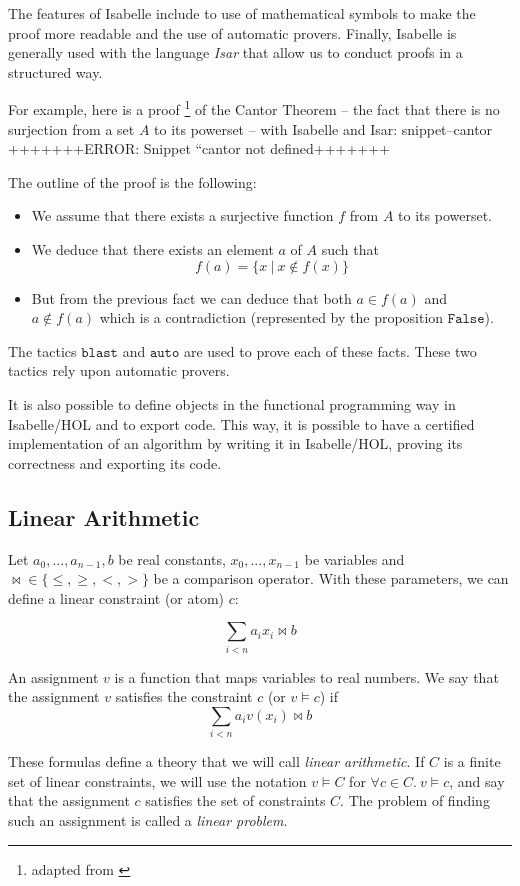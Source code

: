 \documentclass{article}
\newcommand{\Snippet}[1]{%
  \ifcsname snippet--#1\endcsname{\csname snippet--#1\endcsname}%
  \else+++++++ERROR: Snippet ``#1 not defined+++++++ \fi}
\begin{document}
The features of Isabelle include to use of mathematical symbols to make the
proof more readable and the use of automatic provers.
Finally, Isabelle is generally used with the language \textit{Isar} that allow
us to conduct proofs in a structured way.

For example, here is a proof
\footnote{adapted from \cite[Section 5.1]{ConcreteSemantics}}
of the Cantor Theorem -- the fact that there is no surjection from a set $A$ to
its powerset -- with Isabelle and Isar:
\Snippet{cantor}

The outline of the proof is the following:
\begin{itemize}
  \item We assume that there exists a surjective function $f$ from $A$ to
    its powerset.
  \item We deduce that there exists an element $a$ of $A$ such that
    $$f(a) = \{x~|~x \notin f(x)\}$$
  \item But from the previous fact we can deduce that both $a \in f(a)$ and $a
    \notin f(a)$ which is a contradiction (represented by the proposition
    $\mathtt{False}$).
\end{itemize}
The tactics $\mathtt{blast}$ and $\mathtt{auto}$
are used to prove each of these facts. These two tactics rely upon automatic
provers.

It is also possible to define objects in the functional programming way in
Isabelle/HOL and to export code. This way, it is possible to have a certified
implementation of an algorithm by writing it in Isabelle/HOL, proving its
correctness and exporting its code.

\subsection{Linear Arithmetic}

Let $a_0, ..., a_{n-1}, b$ be real constants, $x_0, ..., x_{n-1}$ be
variables and ${\bowtie} \in \{\leqslant,\geqslant,<,>\}$ be a comparison
operator. With these parameters, we can define a linear constraint (or atom)
$c$:

$$\sum_{i < n} a_i x_i \bowtie b$$

An assignment $v$ is a function that maps variables to real numbers.
We say that the assignment $v$ satisfies the constraint $c$ (or $v \vDash c$)
if $$\sum_{i < n} a_i v(x_i) \bowtie b$$

These formulas define a theory that we will call \textit{linear arithmetic}.
If $C$ is a finite set of linear constraints,
we will use the notation $v \vDash C$ for $\forall c \in C.~v \vDash c$, and
say that the assignment $c$ satisfies the set of constraints $C$. The
problem of finding such an assignment is called a
\textit{linear problem}.
\end{document}
